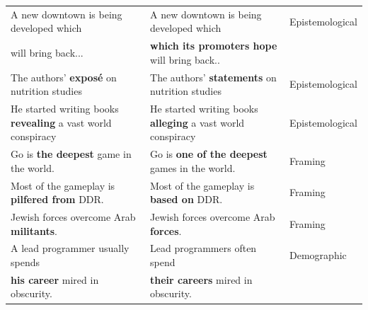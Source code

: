 \begin{table}[ht]
\begin{tabular}{lll}
A new downtown is being developed which &  A new downtown is being developed which & Epistemological  \\ [-2pt]
will bring back... & \textbf{which its promoters hope} will bring back.. \\  \hline
The authors' \textbf{expos\'{e}} on nutrition studies & The authors' \textbf{statements} on nutrition studies & Epistemological \\ \hline
He started writing books \textbf{revealing} a vast world conspiracy &
%
He started writing books \textbf{alleging} a vast world conspiracy &Epistemological\\ \hline
Go is \textbf{the deepest} game in the world. & Go is \textbf{one of the deepest} games in the world. &  Framing \\ \hline
Most of the gameplay is \textbf{pilfered from} DDR. & Most of the gameplay is \textbf{based on} DDR.  & Framing \\ \hline
Jewish forces overcome Arab \textbf{militants}.     & Jewish forces overcome Arab \textbf{forces}.   & Framing     \\ \hline
A lead programmer usually spends & Lead programmers often spend & Demographic \\[-2pt]
\textbf{his career} mired in obscurity.  & \textbf{their careers} mired in obscurity.  &       \\ \hline

\end{tabular}
\end{table}
